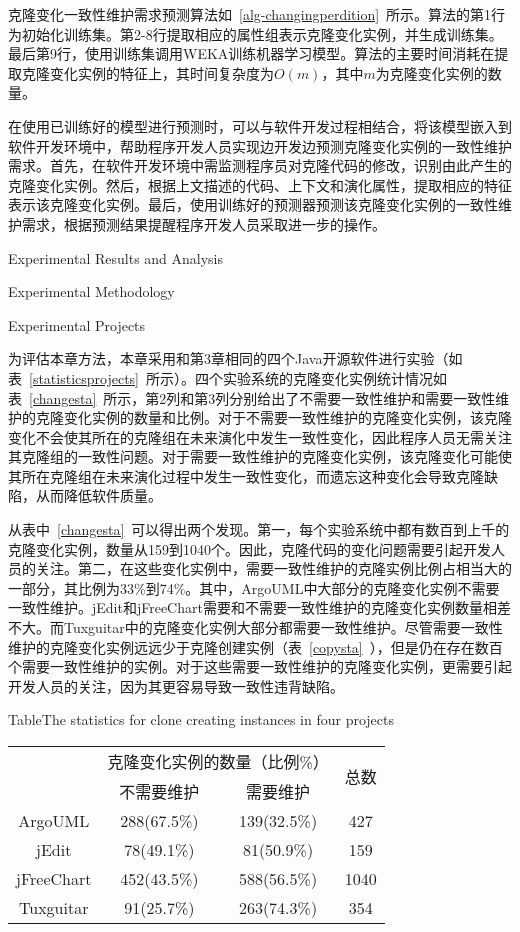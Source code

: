 克隆变化一致性维护需求预测算法如~\ref{alg-changingperdition}~所示。算法的第1行为初始化训练集。第2-8行提取相应的属性组表示克隆变化实例，并生成训练集。最后第9行，使用训练集调用WEKA训练机器学习模型。算法的主要时间消耗在提取克隆变化实例的特征上，其时间复杂度为$O(m)$，其中$m$为克隆变化实例的数量。

在使用已训练好的模型进行预测时，可以与软件开发过程相结合，将该模型嵌入到软件开发环境中，帮助程序开发人员实现边开发边预测克隆变化实例的一致性维护需求。首先，在软件开发环境中需监测程序员对克隆代码的修改，识别由此产生的克隆变化实例。然后，根据上文描述的代码、上下文和演化属性，提取相应的特征表示该克隆变化实例。最后，使用训练好的预测器预测该克隆变化实例的一致性维护需求，根据预测结果提醒程序开发人员采取进一步的操作。

{Experimental Results and Analysis}

{Experimental Methodology}

{Experimental Projects}

为评估本章方法，本章采用和第3章相同的四个Java开源软件进行实验（如表~\ref{statisticsprojects}~所示）。四个实验系统的克隆变化实例统计情况如表~\ref{changesta}~所示，第2列和第3列分别给出了不需要一致性维护和需要一致性维护的克隆变化实例的数量和比例。对于不需要一致性维护的克隆变化实例，该克隆变化不会使其所在的克隆组在未来演化中发生一致性变化，因此程序人员无需关注其克隆组的一致性问题。对于需要一致性维护的克隆变化实例，该克隆变化可能使其所在克隆组在未来演化过程中发生一致性变化，而遗忘这种变化会导致克隆缺陷，从而降低软件质量。

从表中~\ref{changesta}~可以得出两个发现。第一，每个实验系统中都有数百到上千的克隆变化实例，数量从159到1040个。因此，克隆代码的变化问题需要引起开发人员的关注。第二，在这些变化实例中，需要一致性维护的克隆实例比例占相当大的一部分，其比例为33\%到74\%。其中，ArgoUML中大部分的克隆变化实例不需要一致性维护。jEdit和jFreeChart需要和不需要一致性维护的克隆变化实例数量相差不大。而Tuxguitar中的克隆变化实例大部分都需要一致性维护。尽管需要一致性维护的克隆变化实例远远少于克隆创建实例（表~\ref{copysta}~），但是仍在存在数百个需要一致性维护的实例。对于这些需要一致性维护的克隆变化实例，更需要引起开发人员的关注，因为其更容易导致一致性违背缺陷。

\begin{table}[htbp]
{Table$\!$}{The statistics for clone creating instances in four projects}
\vspace{0.5em}
\centering
\wuhao
\begin{tabular}{cccc}
\toprule[1.5pt]
~\multirow{2}{*}{实验系统}& \multicolumn{2}{c}{克隆变化实例的数量（比例\%）} & \multirow{2}{*}{总数}\\ 
 \cline{2-3}
~&{不需要维护} &{需要维护} & ~\\
\midrule[1pt]
ArgoUML&288(67.5\%)&139(32.5\%)&427\\
jEdit&78(49.1\%)&81(50.9\%)&159\\
jFreeChart&452(43.5\%)&588(56.5\%)&1040\\
Tuxguitar&91(25.7\%)&263(74.3\%)&354\\
\bottomrule[1.5pt]
\end{tabular}
\end{table}

